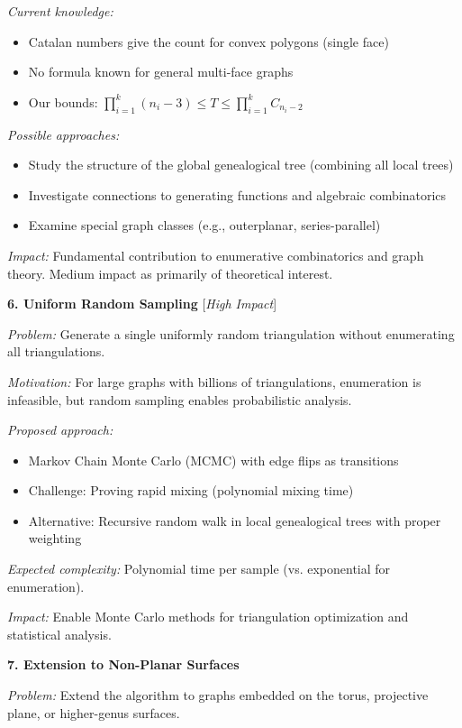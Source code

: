 \documentclass[12pt,a4paper]{article}
\theoremstyle{definition}
\theoremstyle{remark}
\begin{document}
\textit{Current knowledge:}
\begin{itemize}
\item Catalan numbers give the count for convex polygons (single face)
\item No formula known for general multi-face graphs
\item Our bounds: $\prod_{i=1}^{k} (n_i - 3) \leq T \leq \prod_{i=1}^{k} C_{n_i-2}$
\end{itemize}

\textit{Possible approaches:}
\begin{itemize}
\item Study the structure of the global genealogical tree (combining all local trees)
\item Investigate connections to generating functions and algebraic combinatorics
\item Examine special graph classes (e.g., outerplanar, series-parallel)
\end{itemize}

\textit{Impact:} Fundamental contribution to enumerative combinatorics and graph theory. Medium impact as primarily of theoretical interest.

\textbf{6. Uniform Random Sampling} [\textit{High Impact}]

\textit{Problem:} Generate a single uniformly random triangulation without enumerating all triangulations.

\textit{Motivation:} For large graphs with billions of triangulations, enumeration is infeasible, but random sampling enables probabilistic analysis.

\textit{Proposed approach:}
\begin{itemize}
\item Markov Chain Monte Carlo (MCMC) with edge flips as transitions
\item Challenge: Proving rapid mixing (polynomial mixing time)
\item Alternative: Recursive random walk in local genealogical trees with proper weighting
\end{itemize}

\textit{Expected complexity:} Polynomial time per sample (vs. exponential for enumeration).

\textit{Impact:} Enable Monte Carlo methods for triangulation optimization and statistical analysis.

\textbf{7. Extension to Non-Planar Surfaces}

\textit{Problem:} Extend the algorithm to graphs embedded on the torus, projective plane, or higher-genus surfaces.
\end{document}
